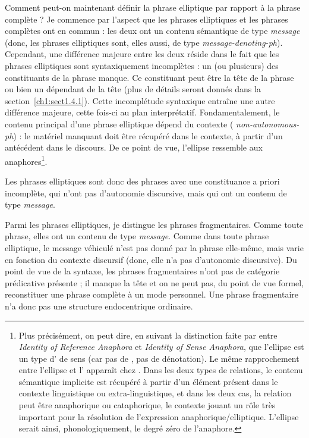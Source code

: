 Comment peut-on maintenant définir la phrase elliptique par rapport à la phrase complète ? Je commence par l’aspect que les phrases elliptiques et les phrases complètes ont en commun : les deux ont un contenu sémantique de type \textit{message} (donc, les phrases elliptiques sont, elles aussi, de type \textit{message-denoting-ph}). Cependant, une différence majeure entre les deux réside dans le fait que les phrases elliptiques sont syntaxiquement incomplètes : un (ou plusieurs) des constituants de la phrase manque. Ce constituant peut être la tête de la phrase ou bien un dépendant de la tête (plus de détails seront donnés dans la section~\ref{ch1:sect1.4.1}). Cette incomplétude syntaxique entraîne une autre différence majeure, cette fois-ci au plan interprétatif. Fondamentalement, le contenu principal d’une phrase elliptique dépend du contexte ({\cad} \textit{non-autonomous-ph}) : le matériel manquant doit être récupéré dans le contexte, à partir d’un antécédent dans le discours. De ce point de vue, l’ellipse ressemble aux anaphores\footnote{Plus précisément, on peut dire, en suivant la distinction faite par \citet{GrinderEtAl1971} entre \textit{Identity of Reference Anaphora} et \textit{Identity of Sense Anaphora}, que l’ellipse est un type d’ de sens (car pas de , pas de dénotation). Le même rapprochement entre l’ellipse et l’ apparaît chez \citet{GinzburgEtAlToAppear}. Dans les deux types de relations, le contenu sémantique implicite est récupéré à partir d’un élément présent dans le contexte linguistique ou extra-linguistique, et dans les deux cas, la relation peut être anaphorique ou cataphorique, le contexte jouant un rôle très important pour la résolution de l’expression anaphorique/elliptique. L’ellipse serait ainsi, phonologiquement, le degré zéro de l’anaphore.}.

Les phrases elliptiques sont donc des phrases avec une constituance a priori incomplète, qui n’ont pas d’autonomie discursive, mais qui ont un contenu de type \textit{message}. 

\newpage
Parmi les phrases elliptiques, je distingue les phrases fragmentaires. Comme toute phrase, elles ont un contenu de type \textit{message}. Comme dans toute phrase elliptique, le message véhiculé n’est pas donné par la phrase elle-même, mais varie en fonction du contexte discursif (donc, elle n’a pas d’autonomie discursive). Du point de vue de la syntaxe, les phrases fragmentaires n’ont pas de catégorie prédicative présente ; il manque la tête et on ne peut pas, du point de vue formel, reconstituer une phrase complète à un mode personnel. Une phrase fragmentaire n’a donc pas une structure endocentrique ordinaire. 

